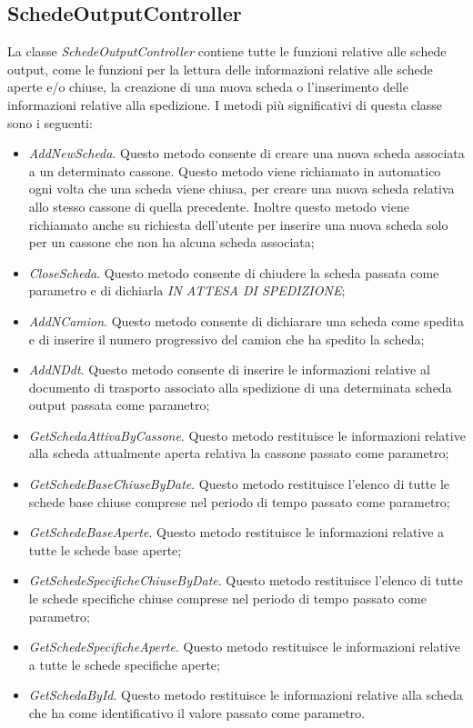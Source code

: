   \subsection{SchedeOutputController}
  La classe \textit{SchedeOutputController} contiene tutte le funzioni relative alle schede output,
  come le funzioni per la lettura delle informazioni relative alle schede aperte e/o chiuse, la creazione di una nuova scheda o 
  l'inserimento delle informazioni relative alla spedizione. I metodi più significativi
  di questa classe sono i seguenti:
  \begin{itemize}
    \item \textit{AddNewScheda}. Questo metodo consente di creare una nuova scheda associata a un determinato cassone.
    Questo metodo viene richiamato in automatico ogni volta che una scheda viene chiusa, per creare una nuova scheda
    relativa allo stesso cassone di quella precedente. Inoltre questo metodo viene richiamato anche su richiesta
    dell'utente per inserire una nuova scheda solo per un cassone che non ha alcuna scheda associata;
    \item \textit{CloseScheda}. Questo metodo consente di chiudere la scheda passata come parametro e di dichiarla
    \textit{IN ATTESA DI SPEDIZIONE};
    \item \textit{AddNCamion}. Questo metodo consente di dichiarare una scheda come spedita e di inserire il numero
    progressivo del camion che ha spedito la scheda;
    \item \textit{AddNDdt}. Questo metodo consente di inserire le informazioni relative al documento di trasporto
    associato alla spedizione di una determinata scheda output passata come parametro;
    \item \textit{GetSchedaAttivaByCassone}. Questo metodo restituisce le informazioni relative alla scheda
    attualmente aperta relativa la cassone passato come parametro;
    \item \textit{GetSchedeBaseChiuseByDate}. Questo metodo restituisce l'elenco di tutte le schede base chiuse
    comprese nel periodo di tempo passato come parametro;
    \item \textit{GetSchedeBaseAperte}. Questo metodo restituisce le informazioni relative a tutte le schede base aperte;
    \item \textit{GetSchedeSpecificheChiuseByDate}. Questo metodo restituisce l'elenco di tutte le schede specifiche
    chiuse comprese nel periodo di tempo passato come parametro;
    \item \textit{GetSchedeSpecificheAperte}. Questo metodo restituisce le informazioni relative a tutte le schede
    specifiche aperte;
    \item \textit{GetSchedaById}. Questo metodo restituisce le informazioni relative alla scheda che ha come
    identificativo il valore passato come parametro.
  \end{itemize}



